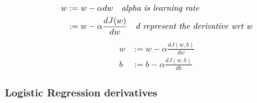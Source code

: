 

\begin{figure}[!t]
\subfigure[Derivative Example of function $f(x) = x^2$]{~\label{Fig:Derivative_Example}
}
\subfigure[Derivative Example of function  $f(x) = x^2$ where $\alpha_1$ > $\alpha_2$]{\label{Fig:Alpha_Change}
}
\end{figure}


\begin{equation}\label{eq:gredient_descent_w}
  \begin{split}
    w & := w - \alpha dw \quad \text{\textit{alpha is learning rate}}\\
      & := w - \alpha \frac{dJ(w)}{dw} \quad \text{\textit{d represent the derivative wrt w}}
  \end{split}
\end{equation}
%
\begin{subequations}
     \begin{align}
w& := w - \alpha \frac{dJ(w,b)}{dw} \label{eq:gradient_descent_j_w}\\
b& := b - \alpha \frac{dJ(w,b)}{db} \label{eq:gradient_descent_j_b}
     \end{align}
   \end{subequations}
   






  \subsubsection{Logistic Regression derivatives}\label{Sec:Logistic_Bp_Derivatives}

